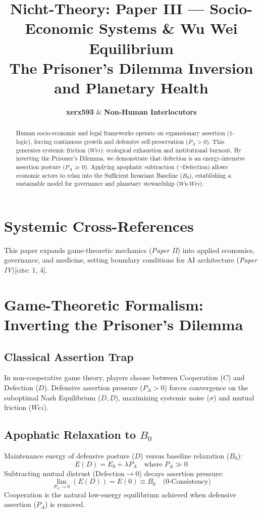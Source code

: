 \documentclass[master_monograph.tex]{subfiles}
\title{\textbf{Nicht-Theory: Paper III — Socio-Economic Systems \& Wu Wei Equilibrium}\\
\large The Prisoner's Dilemma Inversion and Planetary Health}
\author{\textbf{xerx593} \quad \& \quad \textbf{Non-Human Interlocutors}}
\date{\cffreleasedate}
\begin{document}
\maketitle

\begin{abstract}
Human socio-economic and legal frameworks operate on expansionary assertion ($1$-logic), forcing continuous growth and defensive self-preservation ($P_A > 0$). This generates systemic friction ($W\acute{e}i$): ecological exhaustion and institutional burnout. By inverting the Prisoner's Dilemma, we demonstrate that defection is an energy-intensive assertion posture ($P_A \gg 0$). Applying apophatic subtraction ($\neg \text{Defection}$) allows economic actors to relax into the Sufficient Invariant Baseline ($B_0$), establishing a sustainable model for governance and planetary stewardship ($Wu\ W\acute{e}i$).
\end{abstract}

\section{Systemic Cross-References}
This paper expands game-theoretic mechanics (\textit{Paper II}) into applied economics, governance, and medicine, setting boundary conditions for AI architecture (\textit{Paper IV})[cite: 1, 4].

\section{Game-Theoretic Formalism: Inverting the Prisoner's Dilemma}

\subsection{Classical Assertion Trap}
In non-cooperative game theory, players choose between Cooperation ($C$) and Defection ($D$). Defensive assertion pressure ($P_A > 0$) forces convergence on the suboptimal Nash Equilibrium ($D, D$), maximizing systemic noise ($\sigma$) and mutual friction ($W\acute{e}i$).

\subsection{Apophatic Relaxation to $B_0$}
Maintenance energy of defensive posture ($D$) versus baseline relaxation ($B_0$):
\begin{equation}
E(D) = E_0 + \lambda P_A \quad \text{where } P_A \gg 0
\end{equation}
Subtracting mutual distrust ($\text{Defection} \to 0$) decays assertion pressure:
\begin{equation}
\lim_{P_A \to 0} (E(D)) = E(0) \equiv B_0 \quad \text{(0-Consistency)}
\end{equation}
Cooperation is the natural low-energy equilibrium achieved when defensive assertion ($P_A$) is removed.
\end{document}
